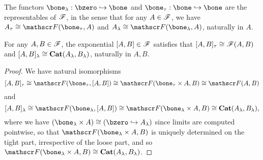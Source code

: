 \documentclass[../thesis.tex]{subfiles}
\begin{document}
%
%
%
\begin{lemma}
  The functors $\bone_\lambda : \bzero \into \bone$ and $\bone_\tau : \bone \into \bone$ are the
  representables of ${\mathscr{F}}$, in the sense that for any $A \in {\mathscr{F}}$, we have $A_\tau \cong \sF(\bone_%
  \tau, A)$ and $A_\lambda
  \cong \sF(\bone_\lambda, A)$, naturally in $A$.
\end{lemma}

\begin{corollary}
  For any $A, B \in {\mathscr{F}}$, the exponential $[A,B] \in {\mathscr{F}}$ satisfies that $[A,B]_\tau \cong {\mathscr{F}}(A,B)
  $ and $[A,B]_\lambda \cong {\mathbf{Cat}}(A_\lambda, B_\lambda)$, naturally in $A,B$.
\end{corollary}
\begin{proof}
  We have natural isomorphisms
  \[[A,B]_\tau \cong \sF(\bone_\tau, [A,B]) \cong \sF(\bone_\tau \times A, B) \cong \sF(A,B)\]
  and
  \[[A,B]_\lambda \cong \sF(\bone_\lambda, [A,B]) \cong \sF(\bone_\lambda \times A, B) \cong
  \Cat(A_\lambda, B_\lambda),\]
  where we have $(\bone_\lambda \times A) \cong (\bzero \into A_\lambda)$ since limits are computed
  pointwise, so that $\sF(\bone_\lambda \times A, B)$ is uniquely determined on the tight part,
  irrespective of the loose part, and so $\sF(\bone_\lambda \times A, B) \cong \Cat(A_\lambda, B_%
  \lambda)$.
\end{proof}
\end{document}
